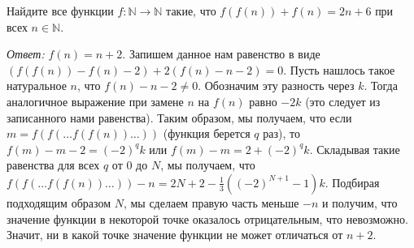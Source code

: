\problem
Найдите все функции $f \colon \mathbb{N} \to \mathbb{N}$ такие, что
$f(f(n)) + f(n) = 2 n + 6$ при всех $n \in \mathbb{N}$.

\solution
\emph{Ответ:} $f(n) = n + 2$.
Запишем данное нам равенство в виде
$(f(f(n)) - f(n) - 2) + 2 (f(n) - n - 2) = 0$.
Пусть нашлось такое натуральное $n$, что $f(n) - n - 2 \neq 0$.
Обозначим эту разность через $k$.
Тогда аналогичное выражение при замене $n$ на $f(n)$ равно $- 2 k$
(это следует из записанного нами равенства).
Таким образом, мы получаем, что если $m = f(f(\ldots f(f(n)) \ldots))$
(функция берется $q$ раз), то $f(m) - m - 2 = (-2)^q k$ или
$f(m) - m = 2 + (-2)^q k$.
Складывая такие равенства для всех $q$ от $0$ до $N$, мы получаем, что
$f(f(\ldots f(f(n)) \ldots)) - n = 2 N + 2 - \frac{1}{3} ((-2)^{N+1} - 1) k$.
Подбирая подходящим образом $N$, мы сделаем правую часть меньше $-n$ и получим,
что значение функции в некоторой точке оказалось отрицательным, что невозможно.
Значит, ни в какой точке значение функции не может отличаться от $n + 2$.
\endproblem
